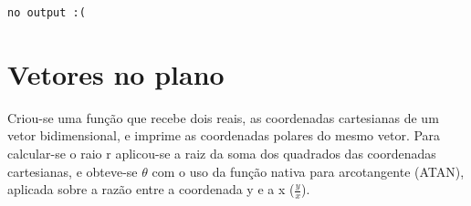 \documentclass{article}
\begin{document}
\begin{lstlisting}
no output :(
\end{lstlisting}

\section{Vetores no plano}

Criou-se uma função que recebe dois reais, as coordenadas cartesianas de um vetor bidimensional, e imprime as coordenadas polares do mesmo vetor. Para calcular-se o raio r aplicou-se a raiz da soma dos quadrados das coordenadas cartesianas, e obteve-se $\theta$ com o uso da função nativa para arcotangente (ATAN), aplicada sobre a razão entre a coordenada y e a x ($\frac{y}{x}$).
\end{document}
